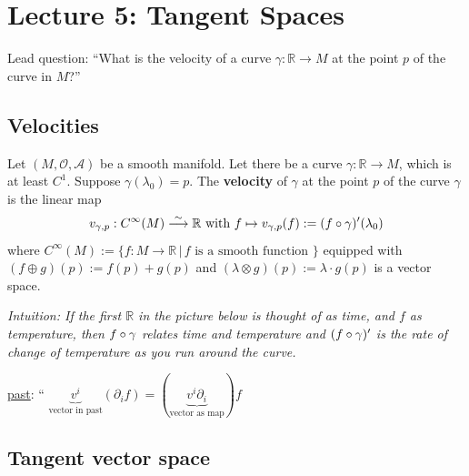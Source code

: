 \section{Lecture 5: Tangent Spaces}
Lead question: ``What is the velocity of a curve $\gamma : \mathbb{R} \to M$ at the point $p$ of the curve in $M$?''

\subsection{Velocities}
\begin{definition} Let $(M,\mathcal{O},\mathcal{A})$ be a smooth manifold. Let there be a curve $\gamma : \mathbb{R} \to M$, which is at least $C^1$. Suppose $\gamma(\lambda_0) =p$. The \textbf{velocity} of $\gamma$ at the point $p$ of the curve $\gamma$ is the linear map \\
\begin{equation*}
v_{\gamma, p} : C^{\infty}(M) \stackrel{\sim}{\longrightarrow} \mathbb{R} \text{ with }
f \mapsto v_{\gamma,p}(f):= (f \circ \gamma)^{\prime}(\lambda_0)
\end{equation*}
where $C^{\infty}(M) := \lbrace f: M \to \mathbb{R} \, | \, f \text{ is a smooth function } \rbrace$ equipped with \\
$(f \oplus g)(p) := f(p) + g(p)$ and $(\lambda \otimes g)(p) := \lambda \cdot g(p)$ is a vector space.
\end{definition}

\textit{Intuition: If the first $\mathbb{R}$ in the picture below is thought of as time, and $f$ as temperature, then $f \circ \gamma$ relates time and temperature and $(f \circ \gamma)^\prime$ is the rate of change of temperature as you run around the curve.}

\underline{past}: `` $\underbrace{v^i}_{\text{vector in past}} (\partial_i f) = (\underbrace{v^i \partial_i}_{\text{vector as map}})f$ 

\subsection{Tangent vector space}

